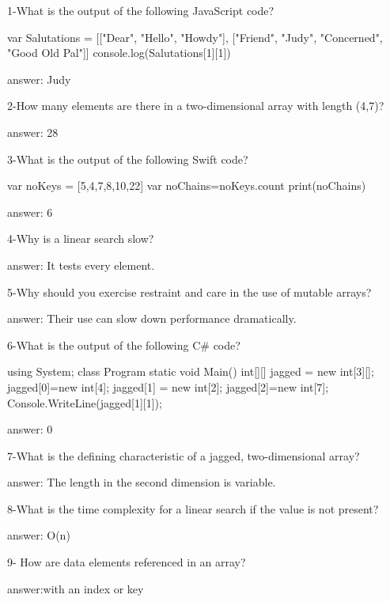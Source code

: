  
1-What is the output of the following JavaScript code?

var Salutations = [["Dear", "Hello", "Howdy"], ["Friend", "Judy", "Concerned", "Good Old Pal"]]
console.log(Salutations[1][1])

answer: Judy

2-How many elements are there in a two-dimensional array with length (4,7)?

answer: 28

3-What is the output of the following Swift code?

var noKeys = [5,4,7,8,10,22]
var noChains=noKeys.count
print(noChains)

answer: 6

4-Why is a linear search slow?

answer: It tests every element.

5-Why should you exercise restraint and care in the use of mutable arrays?

answer: Their use can slow down performance dramatically.

6-What is the output of the following C# code?

using System;
class Program
{
    static void Main() {
       int[][] jagged = new int[3][];
       jagged[0]=new int[4];
       jagged[1] = new int[2];
       jagged[2]=new int[7];
       Console.WriteLine(jagged[1][1]);
}}

answer: 0

7-What is the defining characteristic of a jagged, two-dimensional  array?


answer: The length in the second dimension is variable.

8-What is the time complexity for a linear search if the value is not present?


answer: O(n)

9- How are data elements referenced in an array?


answer:with an index or key
